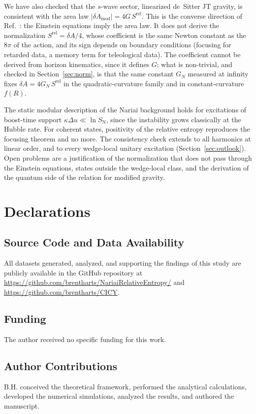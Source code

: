 \documentclass[11pt]{article}
\newcommand{\Srel}{S^{\mathrm{rel}}}
\begin{document}
We have also checked that the $s$-wave sector, linearized de~Sitter JT gravity, is consistent with the area law $|\delta A_{\mathrm{mod}}|=4G\,\Srel$. This is the converse direction of Ref.~\cite{DorauMuch}: the Einstein equations imply the area law. It does not derive the normalization $\Srel=\delta A/4$, whose coefficient is the same Newton constant as the $8\pi$ of the action, and its sign depends on boundary conditions (focusing for retarded data, a memory term for teleological data). The coefficient cannot be derived from horizon kinematics, since it defines $G$; what is non-trivial, and checked in Section~\ref{sec:norm}, is that the same constant $G_N$ measured at infinity fixes $\delta A=4G_N\,\Srel$ in the quadratic-curvature family and in constant-curvature $f(R)$.

The static modular description of the Nariai background holds for excitations of boost-time support $\kappa\Delta u\ll\ln S_{\mathrm N}$, since the instability grows classically at the Hubble rate. For coherent states, positivity of the relative entropy reproduces the focusing theorem and no more. The consistency check extends to all harmonics at linear order, and to every wedge-local unitary excitation (Section~\ref{sec:outlook}). Open problems are a justification of the normalization that does not pass through the Einstein equations, states outside the wedge-local class, and the derivation of the quantum side of the relation for modified gravity.

\section*{Declarations}
\footnotesize

\subsection*{Source Code and Data Availability}
All datasets generated, analyzed, and supporting the findings of this study are publicly available in the GitHub repository at \url{https://github.com/brentharts/NariaiRelativeEntropy/}
and \url{https://github.com/brentharts/CICY}.

\subsection*{Funding}
The author received no specific funding for this work.

\subsection*{Author Contributions}
B.H. conceived the theoretical framework, performed the analytical calculations, developed the numerical simulations, analyzed the results, and authored the manuscript.
\end{document}

